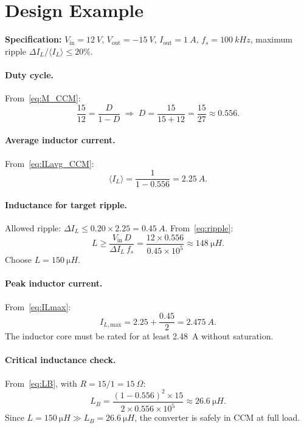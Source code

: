 \documentclass[12pt,a4paper]{article}
\newcommand{\Vin}{V_{\mathrm{in}}}
\newcommand{\Vout}{V_{\mathrm{out}}}
\newcommand{\Iout}{I_{\mathrm{out}}}
\newcommand{\ILmax}{I_{L,\mathrm{max}}}
\newcommand{\ILavg}{\langle I_L \rangle}
\newcommand{\DeltaIL}{\Delta I_L}
\newcommand{\fs}{f_s}
\begin{document}
\section{Design Example}
\label{sec:example}

\textbf{Specification:}
$\Vin = \SI{12}{V}$, $\Vout = -\SI{15}{V}$, $\Iout = \SI{1}{A}$,
$\fs = \SI{100}{kHz}$, maximum ripple $\DeltaIL/\ILavg \le 20\%$.

\paragraph{Duty cycle.}
From~\eqref{eq:M_CCM}:
\begin{equation*}
  \frac{15}{12} = \frac{D}{1-D}
  \;\Rightarrow\;
  D = \frac{15}{15+12} = \frac{15}{27} \approx 0.556.
\end{equation*}

\paragraph{Average inductor current.}
From~\eqref{eq:ILavg_CCM}:
\begin{equation*}
  \ILavg = \frac{1}{1-0.556} = \SI{2.25}{A}.
\end{equation*}

\paragraph{Inductance for target ripple.}
Allowed ripple: $\DeltaIL \le 0.20 \times 2.25 = \SI{0.45}{A}$.
From~\eqref{eq:ripple}:
\begin{equation*}
  L \ge \frac{\Vin\,D}{\DeltaIL\,\fs}
     = \frac{12 \times 0.556}{0.45 \times 10^5}
     \approx \SI{148}{\micro H}.
\end{equation*}
Choose $L = \SI{150}{\micro H}$.

\paragraph{Peak inductor current.}
From~\eqref{eq:ILmax}:
\begin{equation*}
  \ILmax = 2.25 + \frac{0.45}{2} = \SI{2.475}{A}.
\end{equation*}
The inductor core must be rated for at least \SI{2.48}{A} without
saturation.

\paragraph{Critical inductance check.}
From~\eqref{eq:LB}, with $R = 15/1 = \SI{15}{\Omega}$:
\begin{equation*}
  L_B = \frac{(1-0.556)^2 \times 15}{2 \times 0.556 \times 10^5}
      \approx \SI{26.6}{\micro H}.
\end{equation*}
Since $L = \SI{150}{\micro H} \gg L_B = \SI{26.6}{\micro H}$, the
converter is safely in CCM at full load.
\end{document}
